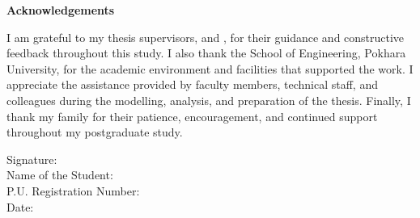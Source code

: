 \begin{titlepage}
\label{front:acknowledgements}
    \vspace*{28pt}
    \vspace{10pt}

    \begin{center}
        {\fontsize{16}{20}\selectfont \textbf{Acknowledgements}}
    \end{center}

    \vspace{14pt}
    \vspace{10pt}

    {\fontsize{12}{18}\selectfont
    \noindent
    I am grateful to my thesis supervisors, \mySupervisorOneName{} and \mySupervisorTwoName, for their guidance and constructive feedback throughout this study. I also thank the School of Engineering, Pokhara University, for the academic environment and facilities that supported the work. I appreciate the assistance provided by faculty members, technical staff, and colleagues during the modelling, analysis, and preparation of the thesis. Finally, I thank my family for their patience, encouragement, and continued support throughout my postgraduate study.
    }

    \vspace*{42pt}
    \vspace{10pt}

    \begin{flushleft}
        {\fontsize{12}{18}\selectfont
        Signature: \underline{\hspace{5cm}} \\[12pt]
        Name of the Student: \myStudentName \\[12pt]
        P.U. Registration Number: \myRegistrationNumber \\[12pt]
        Date: \underline{\hspace{5cm}}
        }
    \end{flushleft}

\end{titlepage}
